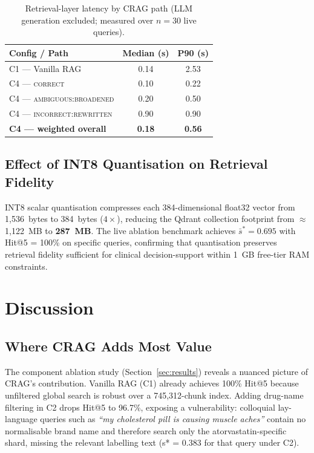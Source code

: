 \documentclass[10pt, twocolumn]{article}
\begin{document}
\begin{table}[H]
  \centering
  \caption{Retrieval-layer latency by CRAG path (LLM generation
    excluded; measured over $n=30$ live queries).}
  \label{tab:latency}
  \begin{tabular}{@{}lcc@{}}
    \toprule
    \textbf{Config / Path}               & \textbf{Median (s)} & \textbf{P90 (s)} \\
    \midrule
    C1 — Vanilla RAG                     & 0.14 & 2.53 \\
    C4 — \textsc{correct}                & 0.10 & 0.22 \\
    C4 — \textsc{ambiguous:broadened}    & 0.20 & 0.50 \\
    C4 — \textsc{incorrect:rewritten}    & 0.90 & 0.90 \\
    \midrule
    \textbf{C4 — weighted overall}       & \textbf{0.18} & \textbf{0.56} \\
    \bottomrule
  \end{tabular}
\end{table}

\subsection{Effect of INT8 Quantisation on Retrieval Fidelity}

INT8 scalar quantisation compresses each 384-dimensional float32 vector
from 1,536~bytes to 384~bytes ($4\times$), reducing the Qdrant
collection footprint from $\approx$\,1,122~MB to \textbf{287~MB}.
The live ablation benchmark achieves $\bar{s}^{*} = 0.695$ with Hit@5
= 100\% on specific queries, confirming that quantisation preserves
retrieval fidelity sufficient for clinical decision-support within
1~GB free-tier RAM constraints.

\section{Discussion}
\label{sec:discussion}

\subsection{Where CRAG Adds Most Value}

The component ablation study (Section~\ref{sec:results}) reveals a
nuanced picture of CRAG's contribution.  Vanilla RAG (C1) already
achieves 100\% Hit@5 because unfiltered global search is robust over a
745{,}312-chunk index.  Adding drug-name filtering in C2 drops
Hit@5 to 96.7\%, exposing a vulnerability: colloquial lay-language
queries such as \textit{``my cholesterol pill is causing muscle
aches''} contain no normalisable brand name and therefore search
only the atorvastatin-specific shard, missing the relevant labelling
text (s* = 0.383 for that query under C2).
\end{document}
